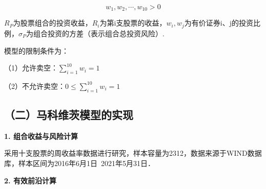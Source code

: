 \begin{equation}
w_1,w_2,\cdots,w_{10}>0
\end{equation}

$R_P$为股票组合的投资收益，$R_i$为第i支股票的收益，$w_i,w_j$为有价证券i、j的投资比例，$\sigma_P$为组合投资的方差（表示组合总投资风险）.

模型的限制条件为：

（1）允许卖空：$\sum_{i=1}^{10} w_i=1$

（2）不允许卖空：$0\leq\sum_{i=1}^{10} w_i=1$

\subsection{（二）马科维茨模型的实现}

\textbf{1. 组合收益与风险计算}

采用十支股票的周收益率数据进行研究，样本容量为2312，数据来源于WIND数据库，样本区间为2016年6月1日~2021年5月31日．

\textbf{2. 有效前沿计算}






